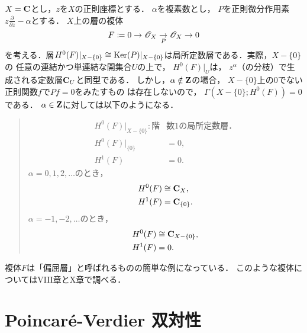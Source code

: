 \(X=\mathbf{C}\)とし，\(z\)を\(X\)の正則座標とする．
\(\alpha\)を複素数とし，
\(P\)を正則微分作用素\(
    \displaystyle z\frac{\partial}{\partial{z}}-\alpha
\)とする．
\(X\)上の層の複体
\begin{equation}
    F\coloneq 0\to \mathscr{O}_X\underset{P}{\to}\mathscr{O}_X\to0
\end{equation}
を考える．層\(
    H^0(F)\rvert_{X-\{0\}}\cong\mathop{\mathrm{Ker}}\nolimits(P)\rvert_{X-\{0\}}
\)は局所定数層である．実際，\(X-\{0\}\)の
任意の連結かつ単連結な開集合\(U\)の上で，
\(H^0(F)\rvert_{U}\)は，
\(z^\alpha\)（の分枝）で生成される定数層\(\mathbf{C}_U\)と同型である．
しかし，\(\alpha\notin\mathbf{Z}\)の場合，
\(X-\{0\}\)上の0でない正則関数\(f\)で\(Pf=0\)をみたすもの
は存在しないので，
\(\Gamma(X-\{0\};H^0(F))=0\)である．
\(\alpha\in\mathbf{Z}\)に対しては以下のようになる．
\begin{quotation}
    \begin{align*}
        H^0(F)\rvert_{X-\{0\}}\colon\text{階}&\text{数} 1\text{の局所定数層．}\\
        H^0(F)\rvert_{\{0\}}&=0,\\
        H^1(F)&=0.
    \end{align*}
    \(\alpha=0,1,2,\dots\)のとき，
    \begin{align*}
        H^0(F)&\cong\mathbf{C}_X,\\
        H^1(F)&=\mathbf{C}_{\{0\}}.
    \end{align*}
    \(\alpha=-1,-2,\dots\)のとき，
    \begin{align*}
        H^0(F)&\cong\mathbf{C}_{X-\{0\}},\\
        H^1(F)&=0.
    \end{align*}
\end{quotation}
複体\(F\)は「偏屈層」と呼ばれるものの簡単な例になっている．
このような複体についてはVIII章とX章で調べる．

\chapter{Poincar\'e-Verdier 双対性}

